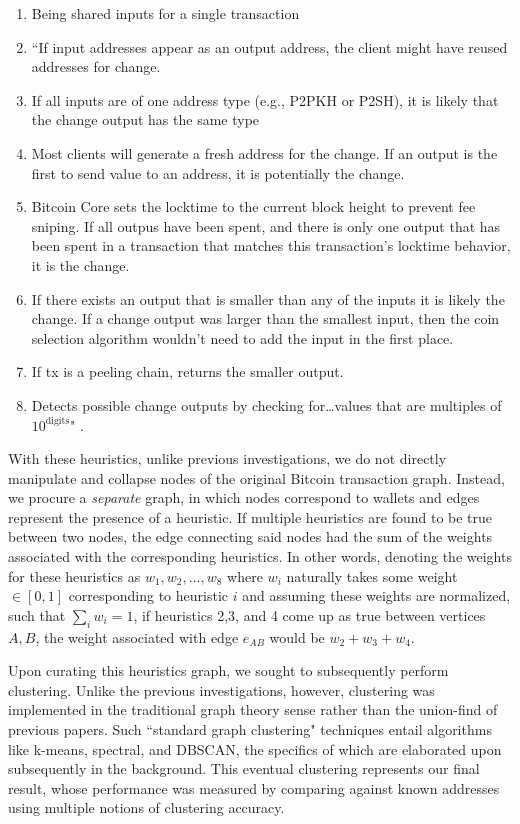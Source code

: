 \documentclass{article}
\begin{document}
\begin{enumerate}
    \item Being shared inputs for a single transaction
    \item ``If input addresses appear as an output address, the client might have reused addresses for change.
    \item If all inputs are of one address type (e.g., P2PKH or P2SH), it is likely that the change output has the same type
    \item Most clients will generate a fresh address for the change. If an output is the first to send value to an address, it is potentially the change.
    \item Bitcoin Core sets the locktime to the current block height to prevent fee sniping. If all outpus have been spent, and there is only one output that has been spent in a transaction that matches this transaction’s locktime behavior, it is the change.
    \item If there exists an output that is smaller than any of the inputs it is likely the change. If a change output was larger than the smallest input, then the coin selection algorithm wouldn’t need to add the input in the first place.
    \item If tx is a peeling chain, returns the smaller output.
    \item Detects possible change outputs by checking for\dots values that are multiples of $10^{\text{digits}}$" \cite{heuristics}.
\end{enumerate}

With these heuristics, unlike previous investigations, we do not directly manipulate and collapse nodes of the original Bitcoin transaction graph. Instead, we procure a \textit{separate} graph, in which nodes correspond to wallets and edges represent the presence of a heuristic. If multiple heuristics are found to be true between two nodes, the edge connecting said nodes had the sum of the weights associated with the corresponding heuristics. In other words, denoting the weights for these heuristics as $w_1, w_2, ..., w_8$ where $w_i$ naturally takes some weight $\in[0,1]$ corresponding to heuristic $i$ and assuming these weights are normalized, such that $\sum_i w_i = 1$, if heuristics 2,3, and 4 come up as true between vertices $A,B$, the weight associated with edge $e_{AB}$ would be $w_2+w_3+w_4$.

Upon curating this heuristics graph, we sought to subsequently perform clustering. Unlike the previous investigations, however, clustering was implemented in the traditional graph theory sense rather than the union-find of previous papers. Such ``standard graph clustering" techniques entail algorithms like k-means, spectral, and DBSCAN, the specifics of which are elaborated upon subsequently in the background. This eventual clustering represents our final result, whose performance was measured by comparing against known addresses using multiple notions of clustering accuracy.
\end{document}
